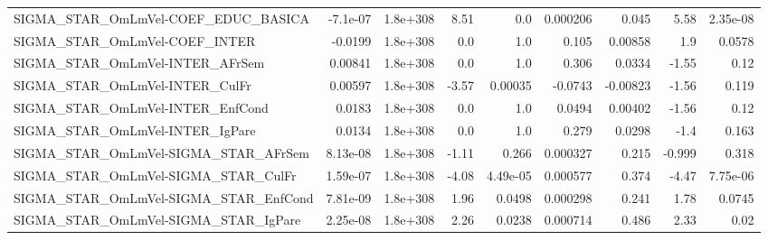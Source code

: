 \begin{tabular}{lrrrrrrrr}
SIGMA\_STAR\_OmLmVel-COEF\_EDUC\_BASICA   &    -7.1e-07 &     1.8e+308 &    8.51 &      0.0 &   0.000206 &       0.045 &         5.58 &      2.35e-08 \\
SIGMA\_STAR\_OmLmVel-COEF\_INTER         &     -0.0199 &     1.8e+308 &     0.0 &      1.0 &      0.105 &     0.00858 &          1.9 &        0.0578 \\
SIGMA\_STAR\_OmLmVel-INTER\_AFrSem       &     0.00841 &     1.8e+308 &     0.0 &      1.0 &      0.306 &      0.0334 &        -1.55 &          0.12 \\
SIGMA\_STAR\_OmLmVel-INTER\_CulFr        &     0.00597 &     1.8e+308 &   -3.57 &  0.00035 &    -0.0743 &    -0.00823 &        -1.56 &         0.119 \\
SIGMA\_STAR\_OmLmVel-INTER\_EnfCond      &      0.0183 &     1.8e+308 &     0.0 &      1.0 &     0.0494 &     0.00402 &        -1.56 &          0.12 \\
SIGMA\_STAR\_OmLmVel-INTER\_IgPare       &      0.0134 &     1.8e+308 &     0.0 &      1.0 &      0.279 &      0.0298 &         -1.4 &         0.163 \\
SIGMA\_STAR\_OmLmVel-SIGMA\_STAR\_AFrSem  &    8.13e-08 &     1.8e+308 &   -1.11 &    0.266 &   0.000327 &       0.215 &       -0.999 &         0.318 \\
SIGMA\_STAR\_OmLmVel-SIGMA\_STAR\_CulFr   &    1.59e-07 &     1.8e+308 &   -4.08 & 4.49e-05 &   0.000577 &       0.374 &        -4.47 &      7.75e-06 \\
SIGMA\_STAR\_OmLmVel-SIGMA\_STAR\_EnfCond &    7.81e-09 &     1.8e+308 &    1.96 &   0.0498 &   0.000298 &       0.241 &         1.78 &        0.0745 \\
SIGMA\_STAR\_OmLmVel-SIGMA\_STAR\_IgPare  &    2.25e-08 &     1.8e+308 &    2.26 &   0.0238 &   0.000714 &       0.486 &         2.33 &          0.02 \\
\bottomrule
\end{tabular}
